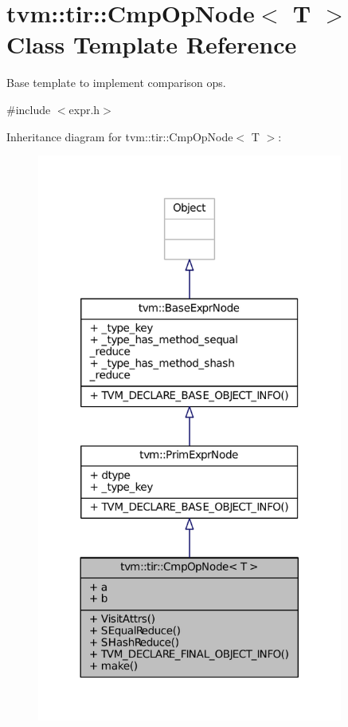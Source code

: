 \hypertarget{classtvm_1_1tir_1_1CmpOpNode}{}\section{tvm\+:\+:tir\+:\+:Cmp\+Op\+Node$<$ T $>$ Class Template Reference}
\label{classtvm_1_1tir_1_1CmpOpNode}


Base template to implement comparison ops.  




{\ttfamily \#include $<$expr.\+h$>$}



Inheritance diagram for tvm\+:\+:tir\+:\+:Cmp\+Op\+Node$<$ T $>$\+:
\nopagebreak
\begin{figure}[H]
\begin{center}
\leavevmode
\includegraphics[width=285pt]{classtvm_1_1tir_1_1CmpOpNode__inherit__graph}
\end{center}
\end{figure}


